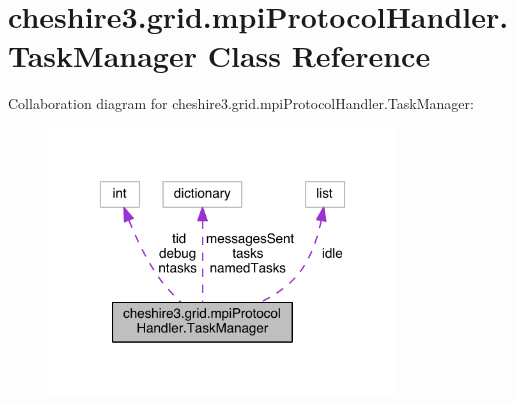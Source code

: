 \hypertarget{classcheshire3_1_1grid_1_1mpi_protocol_handler_1_1_task_manager}{\section{cheshire3.\-grid.\-mpi\-Protocol\-Handler.\-Task\-Manager Class Reference}
\label{classcheshire3_1_1grid_1_1mpi_protocol_handler_1_1_task_manager}
}


Collaboration diagram for cheshire3.\-grid.\-mpi\-Protocol\-Handler.\-Task\-Manager\-:
\nopagebreak
\begin{figure}[H]
\begin{center}
\leavevmode
\includegraphics[width=262pt]{classcheshire3_1_1grid_1_1mpi_protocol_handler_1_1_task_manager__coll__graph}
\end{center}
\end{figure}
